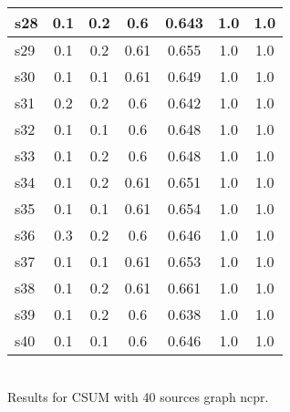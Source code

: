 \documentclass{article}
\begin{document}
\begin{tabular}{|l|c|c|c|c|c|c|}
\hline
s28 &0.1 & 0.2 & 0.6 & 0.643 & 1.0 & 1.0\\
\hline
s29 &0.1 & 0.2 & 0.61 & 0.655 & 1.0 & 1.0\\
\hline
s30 &0.1 & 0.1 & 0.61 & 0.649 & 1.0 & 1.0\\
\hline
s31 &0.2 & 0.2 & 0.6 & 0.642 & 1.0 & 1.0\\
\hline
s32 &0.1 & 0.1 & 0.6 & 0.648 & 1.0 & 1.0\\
\hline
s33 &0.1 & 0.2 & 0.6 & 0.648 & 1.0 & 1.0\\
\hline
s34 &0.1 & 0.2 & 0.61 & 0.651 & 1.0 & 1.0\\
\hline
s35 &0.1 & 0.1 & 0.61 & 0.654 & 1.0 & 1.0\\
\hline
s36 &0.3 & 0.2 & 0.6 & 0.646 & 1.0 & 1.0\\
\hline
s37 &0.1 & 0.1 & 0.61 & 0.653 & 1.0 & 1.0\\
\hline
s38 &0.1 & 0.2 & 0.61 & 0.661 & 1.0 & 1.0\\
\hline
s39 &0.1 & 0.2 & 0.6 & 0.638 & 1.0 & 1.0\\
\hline
s40 &0.1 & 0.1 & 0.6 & 0.646 & 1.0 & 1.0\\
\hline
\end{tabular}\\

\noindent Results for CSUM with 40 sources graph ncpr.
\end{document}
